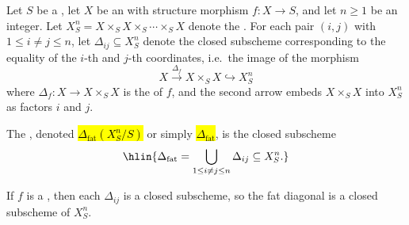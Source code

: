 \begin{definition} \label{definition:fat_diagonal_of_n_fold_relative_product}
Let $S$ be a , let $X$ be an  with structure morphism $f \colon X \to S$, and let $n \geq 1$ be an integer. Let $X^n_S = X \times_S X \times_S \cdots \times_S X$ denote the . For each pair $(i,j)$ with $1 \leq i \neq j \leq n$, let $\Delta_{ij} \subseteq X^n_S$ denote the closed subscheme corresponding to the equality of the $i$-th and $j$-th coordinates, i.e.\ the image of the morphism
$$X \xrightarrow{\Delta_f} X \times_S X \hookrightarrow X^n_S$$
where $\Delta_f \colon X \to X \times_S X$ is the  of $f$, and the second arrow embeds $X \times_S X$ into $X^n_S$ as factors $i$ and $j$.

The , denoted \hl{$\Delta_{\mathrm{fat}}(X^n_S/S)$} or simply \hl{$\Delta_{\mathrm{fat}}$}, is the closed subscheme
$$\hlin{\Delta_{\mathrm{fat}} = \bigcup_{1 \leq i \neq j \leq n} \Delta_{ij} \subseteq X^n_S.}$$

If $f$ is a , then each $\Delta_{ij}$ is a closed subscheme, so the fat diagonal is a closed subscheme of $X^n_S$.
\end{definition}
